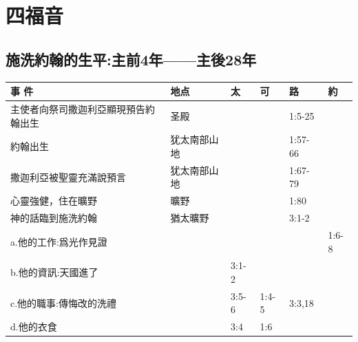 
\chapter{四福音}
\section{施洗約翰的生平:主前4年——主後28年}
\begin{table}[H]
\centering
\begin{tabular}{p{}|l|l|l|l|l} \toprule
 事 件 &地点&\multicolumn{1}{p{5em}|}{太} & \multicolumn{1}{p{4.215em}|}{可} & \multicolumn{1}{p{4.215em}|}{路} & \multicolumn{1}{p{4.215em}}{約} \\\midrule

主使者向祭司撒迦利亞顯現預告約翰出生&圣殿&&&1:5-25&\\
\midrule
約翰出生&犹太南部山地&&&1:57-66&\\\midrule
撒迦利亞被聖靈充滿說預言&犹太南部山地&&&1:67-79&\\\midrule
心靈強健，住在曠野&曠野&&&1:80&\\\midrule

\multicolumn{1}{p{20.075em}|}{神的話臨到施洗約翰} & 猶太曠野  & \multicolumn{1}{r|}{} & \multicolumn{1}{r|}{} &3:1-2 &  \\ \midrule

 \multicolumn{1}{p{13.43em}|}{a.他的工作:爲光作見證} & \multicolumn{1}{l|}{} & \multicolumn{1}{r|}{} & \multicolumn{1}{l|}{} & \multicolumn{1}{r|}{} & \multicolumn{1}{p{4.215em}}{1:6-8} \\

\multicolumn{1}{p{13.43em}|}{b.他的資訊:天國進了} & \multicolumn{1}{l|}{} &  \multicolumn{1}{l|}{3:1-2} & \multicolumn{1}{r|}{} & \multicolumn{1}{r|}{} &  \\

 \multicolumn{1}{p{13.43em}|}{c.他的職事:傳悔改的洗禮} & \multicolumn{1}{l|}{} &\multicolumn{1}{l|}{3:5-6} &\multicolumn{1}{l|}{1:4-5} & \multicolumn{1}{l|}{3:3,18}&   \\

 \multicolumn{1}{p{13.43em}|}{d.他的衣食} & \multicolumn{1}{l|}{} & \multicolumn{1}{l|}{3:4} & \multicolumn{1}{l|}{1:6} & \multicolumn{1}{r|}{} &  \\


\end{tabular}
\end{table}
